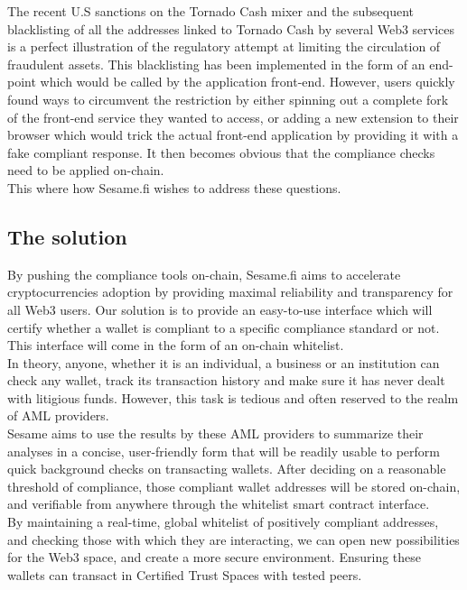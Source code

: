 ﻿\documentclass[a4paper]{article}
\let\OldTexttrademark\texttrademark
\renewcommand{\texttrademark}{\OldTexttrademark\xspace}%
\begin{document}
The recent U.S sanctions on the Tornado Cash mixer and the subsequent blacklisting of all the addresses linked to Tornado Cash by several Web3 services is a perfect illustration of the regulatory attempt at limiting the circulation of fraudulent assets. This blacklisting has been implemented in the form of an end-point which would be called by the application front-end. However, users quickly found ways to circumvent the restriction by either spinning out a complete fork of the front-end service they wanted to access, or adding a new extension to their browser which would trick the actual front-end application by providing it with a fake compliant response.
It then becomes obvious that the compliance checks need to be applied on-chain. \\


This where how Sesame.fi wishes to address these questions.
\subsection{The solution}
By pushing the compliance tools on-chain, Sesame.fi aims to accelerate cryptocurrencies adoption by providing maximal reliability and transparency for all Web3 users. Our solution is to provide an easy-to-use interface which will certify whether a wallet is compliant to a specific compliance standard or not. This interface will come in the form of an on-chain whitelist. \\

In theory, anyone, whether it is an individual, a business or an institution can check any wallet, track its transaction history and make sure it has never dealt with litigious funds. However, this task is tedious and often reserved to the realm of AML providers. \\

Sesame aims to use the results by these AML providers to summarize their analyses in a concise, user-friendly form that will be readily usable to perform quick background checks on transacting wallets. After deciding on a reasonable threshold of compliance, those compliant wallet addresses will be stored on-chain, and verifiable from anywhere through the whitelist smart contract interface. \\

By maintaining a real-time, global whitelist of positively compliant addresses, and checking those with which they are interacting, we can open new possibilities for the Web3 space, and create a more secure environment. Ensuring these wallets can transact in Certified Trust Spaces\texttrademark with tested peers. \\
\end{document}
